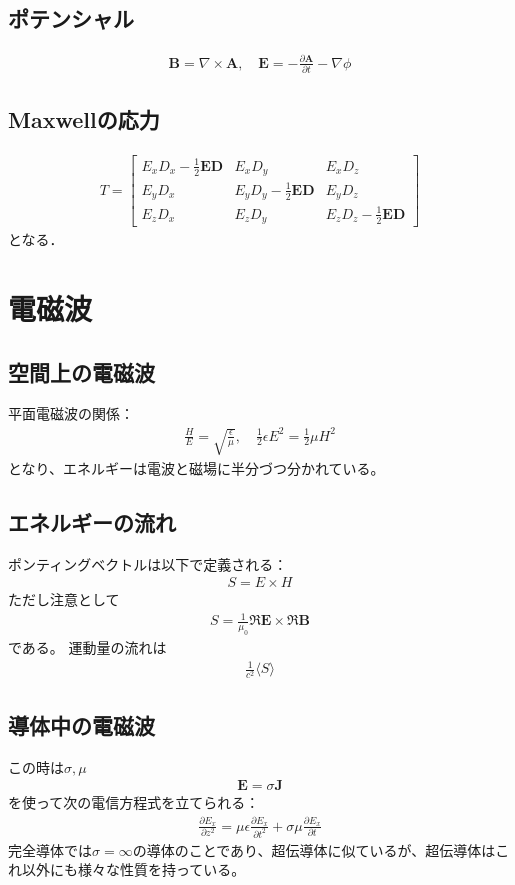 \documentclass[12pt,dvipdfmx]{jsarticle}
\begin{document}
\subsection*{\large{ポテンシャル}}
\begin{eqnarray}
  \bm{B} = \nabla\times \bm{A},\quad \bm{E} = -\frac{\partial\bm{A}}{\partial t} -\nabla\phi
\end{eqnarray}
\subsection*{\large{Maxwellの応力}}
\begin{eqnarray}
  T = 
  \begin{bmatrix}
    E_x D_x -\frac{1}{2}\bm{E}\bm{D} & E_x D_y & E_x D_z\\
    E_y D_x  & E_y D_y -\frac{1}{2}\bm{E}\bm{D}  & E_y D_z\\
    E_z D_x  & E_z D_y & E_z D_z -\frac{1}{2}\bm{E}\bm{D}
  \end{bmatrix}
\end{eqnarray}
となる．
\section*{\Large{電磁波}}
\subsection*{\large{空間上の電磁波}}
平面電磁波の関係：
\begin{eqnarray}
  \frac{H}{E}= \sqrt{\frac{\epsilon}{\mu}},\quad \frac{1}{2}\epsilon E^2 = \frac{1}{2}\mu H^2
\end{eqnarray}
となり、エネルギーは電波と磁場に半分づつ分かれている。
\subsection*{\large{エネルギーの流れ}}
ポンティングベクトルは以下で定義される：
\begin{eqnarray}
  S = E\times H
\end{eqnarray}
ただし注意として
\begin{eqnarray}
  S = \frac{1}{\mu_0}\Re\bm{E}\times\Re\bm{B}
\end{eqnarray}
である。
運動量の流れは
\begin{eqnarray}
  \frac{1}{c^2}\langle S \rangle
\end{eqnarray}
\subsection*{\large{導体中の電磁波}}
この時は$\sigma,\mu$
\begin{eqnarray}
  \bm{E} = \sigma \bm{J}
\end{eqnarray}
を使って次の電信方程式を立てられる：
\begin{eqnarray}
  \frac{\partial E_x}{\partial z^2} = \mu\epsilon\frac{\partial E_x}{\partial t^2} + \sigma\mu\frac{\partial E_x}{\partial t}
\end{eqnarray}
完全導体では$\sigma=\infty$の導体のことであり、超伝導体に似ているが、超伝導体はこれ以外にも様々な性質を持っている。
\end{document}
